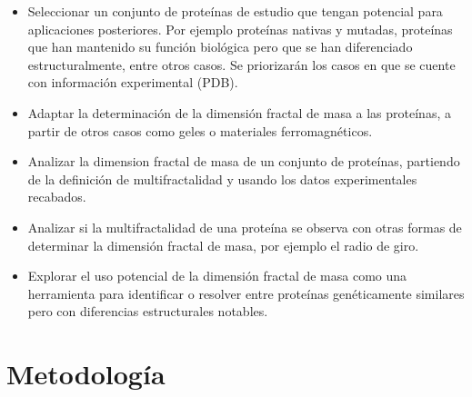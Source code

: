 \documentclass[11pt]{article}
\begin{document}
\begin{itemize}

\item Seleccionar un conjunto de prote\'{i}nas de estudio que tengan potencial para aplicaciones posteriores.
Por ejemplo prote\'{i}nas nativas y mutadas, prote\'{i}nas que han mantenido su funci\'{o}n biol\'{o}gica pero que se
han diferenciado estructuralmente, entre otros casos. Se priorizar\'{a}n los casos en que se cuente con informaci\'{o}n
experimental (PDB).

\item Adaptar la determinaci\'{o}n de la dimensi\'{o}n fractal de masa a las prote\'{i}nas, a partir de otros casos como geles o materiales ferromagn\'{e}ticos.

\item Analizar la dimension fractal de masa de un conjunto de prote\'{i}nas, partiendo de la definici\'{o}n de multifractalidad y usando los datos experimentales recabados.

\item Analizar si la multifractalidad de una prote\'{i}na se observa con otras formas de determinar la
dimensi\'{o}n fractal de masa, por ejemplo el radio de giro.

\item Explorar el uso potencial de la dimensi\'{o}n fractal de masa como una herramienta para identificar
o resolver entre prote\'{i}nas gen\'{e}ticamente similares pero con diferencias estructurales notables.

\end{itemize}

\clearpage

\section{Metodolog\'{i}a}
\end{document}
